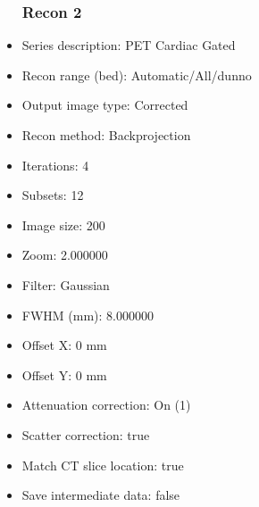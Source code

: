 \documentclass[12pt]{article}
\begin{document}
\begin{itemize}
\subsubsection{Recon 2}
\item Series description: PET Cardiac Gated
\item Recon range (bed): Automatic/All/dunno
\item Output image type: Corrected
\item Recon method: Backprojection
\item Iterations: 4
\item Subsets: 12
\item Image size: 200
\item Zoom: 2.000000
\item Filter: Gaussian
\item FWHM (mm): 8.000000
\item Offset X: 0 mm
\item Offset Y: 0 mm
\item Attenuation correction: On (1)
\item Scatter correction: true
\item Match CT slice location: true
\item Save intermediate data: false
\end{itemize}
\end{document}
